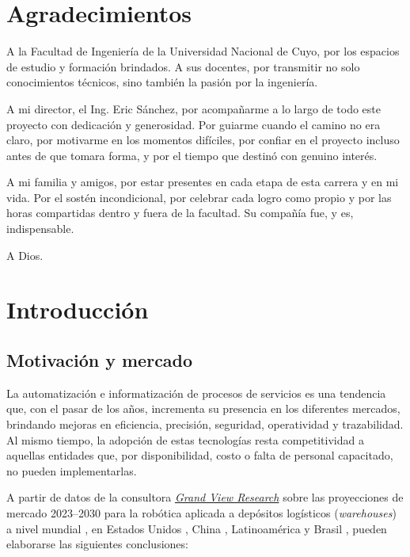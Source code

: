 \documentclass{article}
\begin{document}
\newpage
\section*{Agradecimientos}

A la Facultad de Ingeniería de la Universidad Nacional de Cuyo, por los espacios de estudio y formación brindados. A sus docentes, por transmitir no solo conocimientos técnicos, sino también la pasión por la ingeniería.

\bigskip

A mi director, el Ing. Eric Sánchez, por acompañarme a lo largo de todo este proyecto con dedicación y generosidad. Por guiarme cuando el camino no era claro, por motivarme en los momentos difíciles, por confiar en el proyecto incluso antes de que tomara forma, y por el tiempo que destinó con genuino interés.

\bigskip

A mi familia y amigos, por estar presentes en cada etapa de esta carrera y en mi vida. Por el sostén incondicional, por celebrar cada logro como propio y por las horas compartidas dentro y fuera de la facultad. Su compañía fue, y es, indispensable.

\bigskip

A Dios.

\newpage
\tableofcontents

\newpage
\section{Introducción}

\subsection{Motivación y mercado}
La automatización e informatización de procesos de servicios es una tendencia que, con el pasar de los años, incrementa su presencia en los diferentes mercados, brindando mejoras en eficiencia, precisión, seguridad, operatividad y trazabilidad. Al mismo tiempo, la adopción de estas tecnologías resta competitividad a aquellas entidades que, por disponibilidad, costo o falta de personal capacitado, no pueden implementarlas.

A partir de datos de la consultora \href{https://www.grandviewresearch.com}{\textit{Grand View Research}} sobre las proyecciones de mercado 2023--2030 para la robótica aplicada a depósitos logísticos (\textit{warehouses}) a nivel mundial \cite{gvrGlobal2024}, en Estados Unidos \cite{gvrUS2024}, China \cite{gvrChina2024}, Latinoamérica \cite{gvrLatAm2024} y Brasil \cite{gvrBrazil2024}, pueden elaborarse las siguientes conclusiones:
\end{document}
